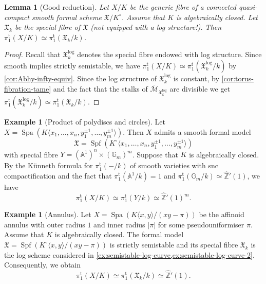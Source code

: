\documentclass[a4paper,twoside,11pt,reqno]{amsart}
\renewcommand{\mathbb}{\mathds}
\newcommand{\bA}{{\mathbb A}}
\newcommand{\bZ}{{\mathbb Z}}
\newcommand{\cM}{{\mathcal M}}
\newcommand{\fX}{{\mathfrak{X}}}
\DeclareMathOperator{\Spf}{Spf}
\DeclareMathOperator{\Spa}{Spa}
\newcommand{\pitame}{\pi_1^{\mathrm{t}}}
\newtheorem{lem}[thm]{Lemma}
\theoremstyle{definition}
\newtheorem{ex}[thm]{Example}
\numberwithin{equation}{subsection}
\begin{document}
\begin{lem}[Good reduction]
    Let $X/K$ be the generic fibre of a connected quasi-compact smooth formal scheme $\fX/K^\circ$.  Assume that $K$ is algebraically closed. 
 Let $\fX_k$ be the special fibre of $\fX$ (not equipped with a log structure!). Then $\pitame(X/K) \simeq \pitame(\fX_k/k)$.
\end{lem}

\begin{proof}
Recall that $\fX_k^{\log}$ denotes the special fibre endowed with log structure. Since smooth implies strictly semistable, we have $\pitame(X/K)\simeq \pitame(\fX_k^{\log}/k)$ by \cref{cor:Abhy-infty-equiv}. Since the log structure of $\fX_k^{\log}$ is constant, by \cref{cor:torus-fibration-tame} and the fact that the stalks of $\overline{\cM}_{\fX^{\log}_k}$ are divisible we get $\pitame(\fX^{\log}_k/k) \simeq \pitame(\fX_k/k)$. 
\end{proof} 

\begin{ex}[Product of polydiscs and circles] \label{ex:polydisc}
    Let $X = \Spa(K\langle x_1, \dots, x_n, y_1^{\pm 1},\dots, y_m^{\pm 1}\rangle)$.   
Then $X$ admits a smooth formal model 
    \[
        \fX = \Spf(K^\circ\langle x_1, \dots, x_n, y_1^{\pm 1},\dots, y_m^{\pm 1}\rangle)
    \]
    with special fibre $Y = (\bA^1)^n\times(\mathbb{G}_m)^m$. Suppose that $K$ is algebraically closed. By the K\"unneth formula for $\pitame(-/k)$ of smooth varieties with snc compactification \cite[Thm. 5.1]{Orgogozo2003:AlterationsGroupeFondamental} and the fact that $\pitame(\bA^1/k)=1$ and $\pitame(\mathbb{G}_m/k)\simeq \widehat{\bZ}'(1)$, we have 
    \[ 
        \pitame(X/K) \simeq \pitame(Y/k)\simeq  \widehat{\bZ}'(1)^m. 
    \]
\end{ex}

\begin{ex}[Annulus]
    Let $X=\Spa(K\langle x, y\rangle/(xy-\pi))$ be the affinoid annulus with outer radius $1$ and inner radius $|\pi|$ for some pseudouniformiser $\pi$.  Assume that $K$ is algebraically closed. 
The formal model $\fX = \Spf(K^\circ\langle x,y\rangle/(xy-\pi))$ is strictly semistable and its special fibre $\fX_k$ is the log scheme considered in \cref{ex:semistable-log-curve,ex:semistable-log-curve-2}. Consequently, we obtain
    \[
        \pitame(X/K)\simeq \pitame(\fX_k/k)\simeq \widehat{\bZ}'(1).
    \]
\end{ex}
\end{document}

